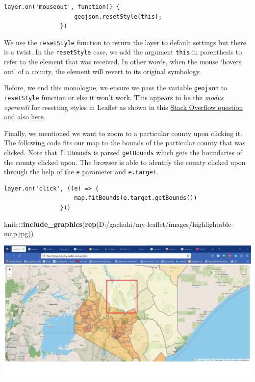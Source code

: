 \documentclass[
]{book}
\newenvironment{Shaded}{\begin{snugshade}}{\end{snugshade}}
\newcommand{\FunctionTok}[1]{\textcolor[rgb]{0.13,0.29,0.53}{\textbf{#1}}}
\newcommand{\NormalTok}[1]{#1}
\newcommand{\SpecialCharTok}[1]{\textcolor[rgb]{0.81,0.36,0.00}{\textbf{#1}}}
\newcommand{\StringTok}[1]{\textcolor[rgb]{0.31,0.60,0.02}{#1}}
\begin{document}
\begin{verbatim}
layer.on('mouseout', function() {
                    geojson.resetStyle(this);
                })
\end{verbatim}

We use the \texttt{resetStyle} function to return the layer to default settings but there is a twist. In the \texttt{resetStyle} case, we add the argument \texttt{this} in parenthesis to refer to the element that was received. In other words, when the mouse `hovers out' of a county, the element will revert to its original symbology.

Before, we end this monologue, we ensure we pass the variable \texttt{geojson} to \texttt{resetStyle} function or else it won't work. This appears to be the \emph{modus operandi} for resetting styles in Leaflet as shown in this \href{https://stackoverflow.com/questions/35072630/why-doesnt-resetstyle-of-leaflet-work-for-me}{Stack Overflow question} and also \href{https://stackoverflow.com/questions/21029533/reset-style-on-leaflet-polygon-on-click}{here}.

Finally, we mentioned we want to zoom to a particular county upon clicking it. The following code fits our map to the bounds of the particular county that was clicked. Note that \texttt{fitBounds} is parsed \texttt{getBounds} which gets the boundaries of the county clicked upon. The browser is able to identify the county clicked upon through the help of the \texttt{e} parameter and \texttt{e.target}.

\begin{verbatim}
layer.on('click', ((e) => {
                    map.fitBounds(e.target.getBounds())
                }))
\end{verbatim}

\begin{Shaded}
\begin{Highlighting}[]
\NormalTok{knitr}\SpecialCharTok{::}\FunctionTok{include\_graphics}\NormalTok{(}\FunctionTok{rep}\NormalTok{(}\StringTok{\textquotesingle{}D:/gachuhi/my{-}leaflet/images/highlightable{-}map.jpg\textquotesingle{}}\NormalTok{))}
\end{Highlighting}
\end{Shaded}

\includegraphics{../images/highlightable-map.jpg}
\end{document}
